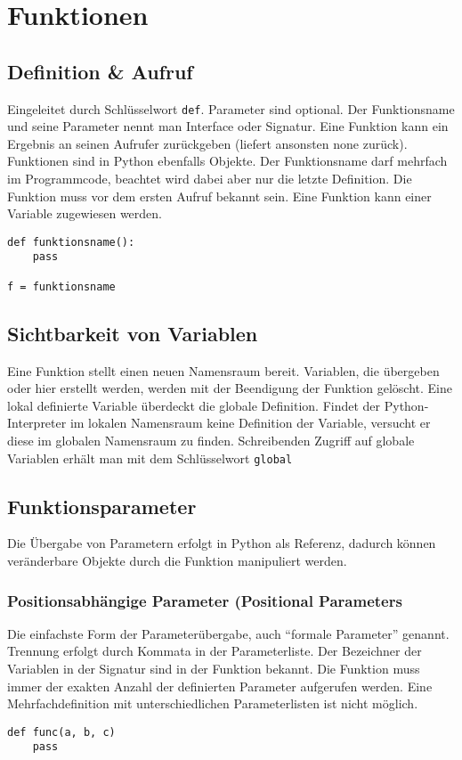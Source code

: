 \chapter{Funktionen}
\section{Definition \& Aufruf}
Eingeleitet durch Schlüsselwort \texttt{def}. Parameter sind optional. Der Funktionsname und seine Parameter nennt man Interface oder Signatur. Eine Funktion kann ein Ergebnis an seinen Aufrufer zurückgeben (liefert ansonsten none zurück). Funktionen sind in Python ebenfalls Objekte. Der Funktionsname darf mehrfach im Programmcode, beachtet wird dabei aber nur die letzte Definition. Die Funktion muss vor dem ersten Aufruf bekannt sein. Eine Funktion kann einer Variable zugewiesen werden.
\begin{lstlisting}
def funktionsname():
    pass
    
f = funktionsname
\end{lstlisting}
\section{Sichtbarkeit von Variablen}
Eine Funktion stellt einen neuen Namensraum bereit. Variablen, die übergeben oder hier erstellt werden, werden mit der Beendigung der Funktion gelöscht. Eine lokal definierte Variable überdeckt die globale Definition. Findet der Python-Interpreter im lokalen Namensraum keine Definition der Variable, versucht er diese im globalen Namensraum zu finden. Schreibenden Zugriff auf globale Variablen erhält man mit dem Schlüsselwort \texttt{global}
\section{Funktionsparameter}
Die Übergabe von Parametern erfolgt in Python als Referenz, dadurch können veränderbare Objekte durch die Funktion manipuliert werden.
\subsection{Positionsabhängige Parameter (Positional Parameters}
Die einfachste Form der Parameterübergabe, auch ``formale Parameter'' genannt. Trennung erfolgt durch Kommata in der Parameterliste. Der Bezeichner der Variablen in der Signatur sind in der Funktion bekannt. Die Funktion muss immer der exakten Anzahl der definierten Parameter aufgerufen werden. Eine Mehrfachdefinition mit unterschiedlichen Parameterlisten ist nicht möglich.
\begin{lstlisting}
def func(a, b, c)
    pass
\end{lstlisting}
